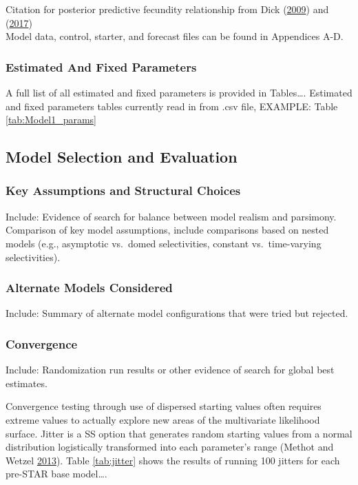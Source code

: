 \documentclass[12pt,]{article}
\begin{document}
Citation for posterior predictive fecundity relationship from Dick
(\protect\hyperlink{ref-dick_modeling_2009}{2009}) and
(\protect\hyperlink{ref-dick_meta-analysis_2017}{2017})\\
Model data, control, starter, and forecast files can be found in
Appendices A-D.

\subsubsection{Estimated And Fixed
Parameters}\label{estimated-and-fixed-parameters}

A full list of all estimated and fixed parameters is provided in
Tables\ldots{}. Estimated and fixed parameters tables currently read in
from .csv file, EXAMPLE: Table \ref{tab:Model1_params}

\subsection{Model Selection and
Evaluation}\label{model-selection-and-evaluation}

\subsubsection{Key Assumptions and Structural
Choices}\label{key-assumptions-and-structural-choices}

Include: Evidence of search for balance between model realism and
parsimony.\\
Comparison of key model assumptions, include comparisons based on nested
models (e.g., asymptotic vs.~domed selectivities, constant
vs.~time-varying selectivities).

\subsubsection{Alternate Models
Considered}\label{alternate-models-considered}

Include: Summary of alternate model configurations that were tried but
rejected.

\subsubsection{Convergence}\label{convergence}

Include: Randomization run results or other evidence of search for
global best estimates.

Convergence testing through use of dispersed starting values often
requires extreme values to actually explore new areas of the
multivariate likelihood surface. Jitter is a SS option that generates
random starting values from a normal distribution logistically
transformed into each parameter's range (Methot and Wetzel
\protect\hyperlink{ref-methot_stock_2013}{2013}). Table \ref{tab:jitter}
shows the results of running 100 jitters for each pre-STAR base
model\ldots{}.
\end{document}
